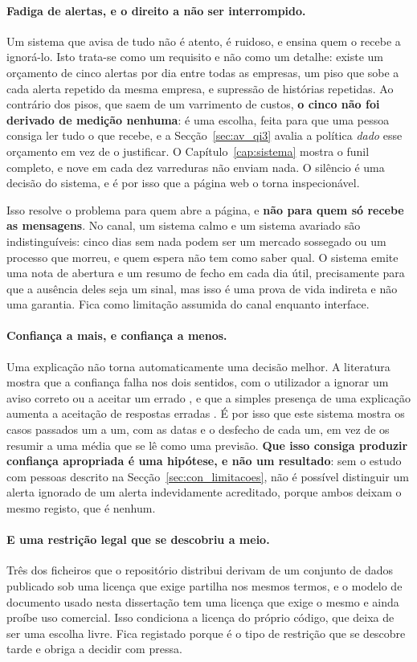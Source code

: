 \paragraph{Fadiga de alertas, e o direito a não ser interrompido.} Um sistema que avisa de tudo
não é atento, é ruidoso, e ensina quem o recebe a ignorá-lo. Isto trata-se como um requisito e não
como um detalhe: existe um orçamento de cinco alertas por dia entre todas as empresas, um piso que
sobe a cada alerta repetido da mesma empresa, e supressão de histórias repetidas. Ao contrário dos
pisos, que saem de um varrimento de custos, \textbf{o cinco não foi derivado de medição nenhuma}:
é uma escolha, feita para que uma pessoa consiga ler tudo o que recebe, e a
Secção~\ref{sec:av_qi3} avalia a política \emph{dado} esse orçamento em vez de o justificar. O
Capítulo~\ref{cap:sistema} mostra o funil completo, e nove em cada dez varreduras não enviam nada.
O silêncio é uma decisão do sistema, e é por isso que a página web o torna inspecionável.

Isso resolve o problema para quem abre a página, e \textbf{não para quem só recebe as mensagens}.
No canal, um sistema calmo e um sistema avariado são indistinguíveis: cinco dias sem nada podem
ser um mercado sossegado ou um processo que morreu, e quem espera não tem como saber qual. O
sistema emite uma nota de abertura e um resumo de fecho em cada dia útil, precisamente para que
a ausência deles seja um sinal, mas isso é uma prova de vida indireta e não uma garantia. Fica
como limitação assumida do canal enquanto interface.

\paragraph{Confiança a mais, e confiança a menos.} Uma explicação não torna automaticamente uma
decisão melhor. A literatura mostra que a confiança falha nos dois sentidos, com o utilizador a
ignorar um aviso correto ou a aceitar um errado \autocite{lee2004trust}, e que a simples presença
de uma explicação aumenta a aceitação de respostas erradas \autocite{bansal2021whole}. É por isso
que este sistema mostra os casos passados um a um, com as datas e o desfecho de cada um, em vez de
os resumir a uma média que se lê como uma previsão. \textbf{Que isso consiga produzir confiança
apropriada é uma hipótese, e não um resultado}: sem o estudo com pessoas descrito na
Secção~\ref{sec:con_limitacoes}, não é possível distinguir um alerta ignorado de um alerta
indevidamente acreditado, porque ambos deixam o mesmo registo, que é nenhum.

\paragraph{E uma restrição legal que se descobriu a meio.} Três dos ficheiros que o repositório
distribui derivam de um conjunto de dados publicado sob uma licença que exige partilha nos mesmos
termos, e o modelo de documento usado nesta dissertação tem uma licença que exige o mesmo e ainda
proíbe uso comercial. Isso condiciona a licença do próprio código, que deixa de ser uma escolha
livre. Fica registado porque é o tipo de restrição que se descobre tarde e obriga a decidir com
pressa.
